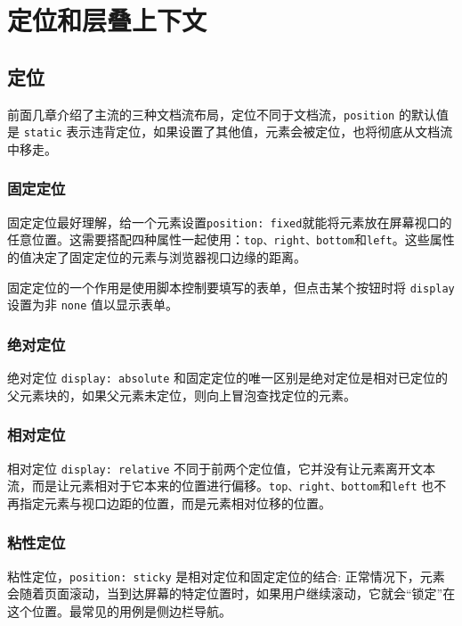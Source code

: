 \section{定位和层叠上下文}

\subsection{定位}
前面几章介绍了主流的三种文档流布局，定位不同于文档流，\texttt{position} 的默认值是 \texttt{static} 表示违背定位，如果设置了其他值，元素会被定位，也将彻底从文档流中移走。

\subsubsection*{固定定位}

固定定位最好理解，给一个元素设置\texttt{position: fixed}就能将元素放在屏幕视口的任意位置。这需要搭配四种属性一起使用：\texttt{top、right、bottom}和\texttt{left}。这些属性的值决定了固定定位的元素与浏览器视口边缘的距离。

固定定位的一个作用是使用脚本控制要填写的表单，但点击某个按钮时将 \texttt{display} 设置为非 \texttt{none} 值以显示表单。

\subsubsection*{绝对定位}

绝对定位 \texttt{display: absolute} 和固定定位的唯一区别是绝对定位是相对已定位的父元素块的，如果父元素未定位，则向上冒泡查找定位的元素。

\subsubsection*{相对定位}

相对定位 \texttt{display: relative} 不同于前两个定位值，它并没有让元素离开文本流，而是让元素相对于它本来的位置进行偏移。\texttt{top、right、bottom}和\texttt{left} 也不再指定元素与视口边距的位置，而是元素相对位移的位置。

\subsubsection*{粘性定位}

粘性定位，\texttt{position: sticky} 是相对定位和固定定位的结合: 正常情况下，元素会随着页面滚动，当到达屏幕的特定位置时，如果用户继续滚动，它就会“锁定”在这个位置。最常见的用例是侧边栏导航。


